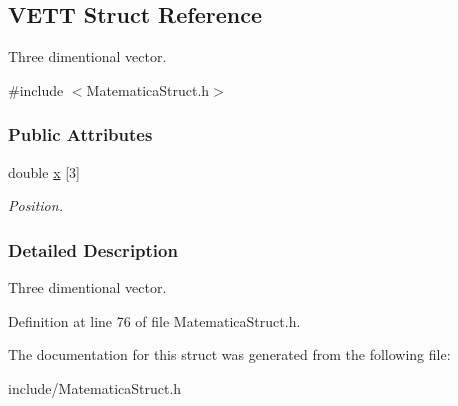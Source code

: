 \hypertarget{structVETT}{\subsection{\-V\-E\-T\-T \-Struct \-Reference}
\label{structVETT}
}


\-Three dimentional vector.  




{\ttfamily \#include $<$\-Matematica\-Struct.\-h$>$}

\subsubsection*{\-Public \-Attributes}
\begin{DoxyCompactItemize}
\item 
\hypertarget{structVETT_a8639a6dd4fb3c4aa452b708733d827b4}{double \hyperlink{structVETT_a8639a6dd4fb3c4aa452b708733d827b4}{x} \mbox{[}3\mbox{]}}\label{structVETT_a8639a6dd4fb3c4aa452b708733d827b4}

\begin{DoxyCompactList}\small\item\em \-Position. \end{DoxyCompactList}\end{DoxyCompactItemize}


\subsubsection{\-Detailed \-Description}
\-Three dimentional vector. 

\-Definition at line 76 of file \-Matematica\-Struct.\-h.



\-The documentation for this struct was generated from the following file\-:\begin{DoxyCompactItemize}
\item 
include/\-Matematica\-Struct.\-h\end{DoxyCompactItemize}

